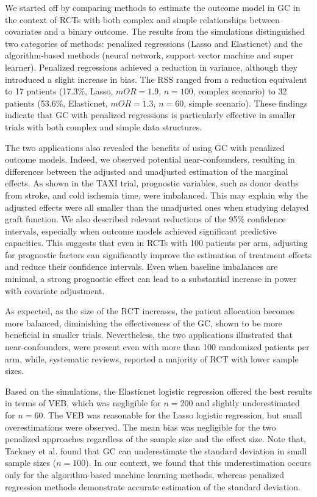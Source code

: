 \documentclass{article}
\begin{document}
We started off by comparing methods to estimate the outcome model in GC in the context of RCTs with both complex and simple relationships between covariates and a binary outcome. The results from the simulations distinguished two categories of methods: penalized regressions (Lasso and Elasticnet) and the algorithm-based methods (neural network, support vector machine and super learner). Penalized regressions achieved a reduction in variance, although they introduced a slight increase in bias. The RSS ranged from a reduction equivalent to 17 patients (17.3\%, Lasso, $mOR=1.9$, $n=100$, complex scenario) to 32 patients (53.6\%, Elasticnet, $mOR=1.3$, $n=60$, simple scenario). These findings indicate that GC with penalized regressions is particularly effective in smaller trials with both complex and simple data structures.

The two applications also revealed the benefits of using GC with penalized outcome models. Indeed, we observed potential near-confounders, resulting in differences between the adjusted and unadjusted estimation of the marginal effects. As shown in the TAXI trial, prognostic variables, such as donor deaths from stroke, and cold ischemia time, were imbalanced. This may explain why the adjusted effects were all  smaller than the unadjusted ones when studying delayed graft function. We also described relevant reductions of the 95\% confidence intervals, especially when outcome models achieved significant predictive capacities. This suggests that even in RCTs with 100 patients per arm, adjusting for prognostic factors can significantly improve the estimation of treatment effects and reduce their confidence intervals. Even when baseline imbalances are minimal, a strong prognostic effect can lead to a substantial increase in power with covariate adjustment.\cite{steyerberg_clinical_2000,pocock_subgroup_2002}


As expected, as the size of the RCT increases, the patient allocation becomes more balanced, diminishing the effectiveness of the GC, shown to be more beneficial in smaller trials. Nevertheless, the two applications illustrated that near-confounders, were present even with more than 100 randomized patients per arm, while, systematic reviews, \cite{robinson_characteristics_2021, anthon_overall_2019} reported a majority of RCT with lower sample sizes.



Based on the simulations, the Elasticnet logistic regression offered the best results in terms of VEB, which was negligible for $n=200$ and slightly underestimated for $n=60$. The VEB was reasonable for the Lasso logistic regression, but small overestimations were observed. The mean bias was negligible for the two penalized approaches regardless of the sample size and the effect size. Note that, Tackney et al.\cite{tackney_comparison_2023} found that GC can underestimate the standard deviation in small sample sizes ($n=100$). In our context, we found that this underestimation occurs only for the algorithm-based machine learning methods, whereas penalized regression methods demonstrate accurate estimation of the standard deviation. 
\end{document}
